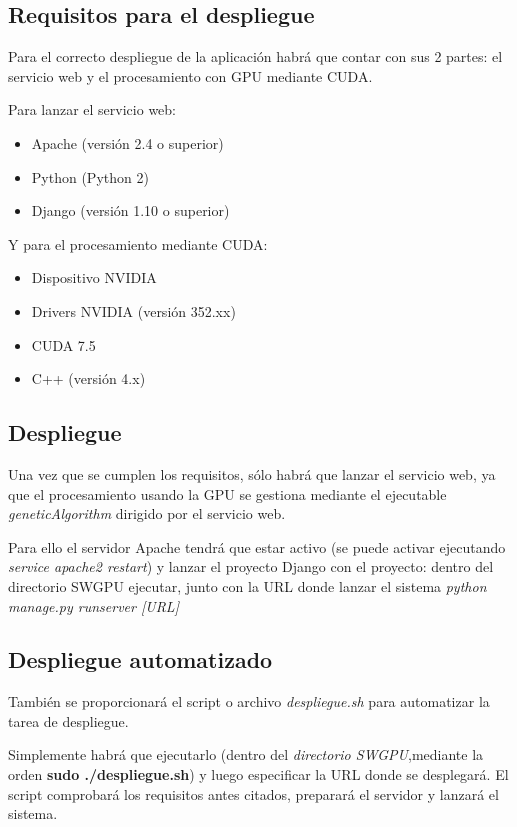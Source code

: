 \subsection{Requisitos para el despliegue}
\bigskip

Para el correcto despliegue de la aplicación habrá que contar con sus 2 partes: el servicio web y el procesamiento con GPU mediante CUDA.

\bigskip
Para lanzar el servicio web:
\begin{itemize}
	\item Apache (versión 2.4 o superior)
	\item Python (Python 2)
	\item Django  (versión 1.10 o superior)
\end{itemize} 

\bigskip
Y para el procesamiento mediante CUDA:
\begin{itemize}
	\item Dispositivo NVIDIA
	\item Drivers NVIDIA (versión 352.xx)
	\item CUDA 7.5
	\item C++ (versión 4.x)
\end{itemize} 

\subsection{Despliegue}
\bigskip


Una vez que se cumplen los requisitos, sólo habrá que lanzar el servicio web, ya que el procesamiento usando la GPU se gestiona mediante el ejecutable \textit{geneticAlgorithm} dirigido por el servicio web.

Para ello el servidor Apache tendrá que estar activo (se puede activar ejecutando \textit{service apache2 restart}) y lanzar el proyecto Django con el proyecto: dentro del directorio SWGPU ejecutar, junto con la URL donde lanzar el sistema \textit{python manage.py runserver [URL]}


\subsection{Despliegue automatizado}
\bigskip
También se proporcionará el script o archivo \textit{despliegue.sh} para automatizar la tarea de despliegue.

Simplemente habrá que ejecutarlo (dentro del \textit{directorio SWGPU},mediante la orden \textbf{sudo ./despliegue.sh}) y luego especificar la URL donde se desplegará. El script comprobará los requisitos antes citados, preparará el servidor y lanzará el sistema.

